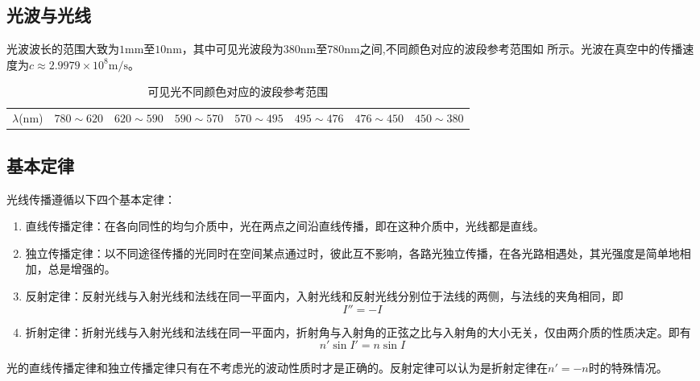 \documentclass[cn,10pt,chinesefont=founder,math=newtx,cite=super,twoside]{elegantbook}
\begin{document}
\subsection{光波与光线}
光波波长的范围大致为$1\mathrm{mm}$至$10\mathrm{nm}$，其中可见光波段为$380\mathrm{nm}$至$780\mathrm{nm}$之间,不同颜色对应的波段参考范围如 所示。光波在真空中的传播速度为$c\approx 2.9979\times 10^8\mathrm{m/s}$。

\begin{table}[htbp]
	\small
	\caption{可见光不同颜色对应的波段参考范围}
	\centering
	\begin{tabular}{cccccccc}
		\toprule
		&\color{red}{红色}&\color{orange}{橙色}&\color{yellow}{黄色}&\color{green}{绿色}&\color{cyan}{青色}&\color{blue}{蓝色}&\color{violet}{紫色}\\
		\midrule
		$\lambda$(nm)&$780\sim620$&$620\sim590$&$590\sim570$&$570\sim495$&$495\sim476$&$476\sim450$&$450\sim380$\\
		\bottomrule
	\end{tabular}
	\label{tab:visible-light}
\end{table}

\subsection{基本定律}
\label{subsect:basic-law}
光线传播遵循以下四个基本定律：
\begin{enumerate}
	\item 直线传播定律：在各向同性的均匀介质中，光在两点之间沿直线传播，即在这种介质中，光线都是直线。
	\item 独立传播定律：以不同途径传播的光同时在空间某点通过时，彼此互不影响，各路光独立传播，在各光路相遇处，其光强度是简单地相加，总是增强的。
	\item 反射定律：反射光线与入射光线和法线在同一平面内，入射光线和反射光线分别位于法线的两侧，与法线的夹角相同，即
	\begin{equation}
	I''=-I
	\end{equation}
	\item 折射定律：折射光线与入射光线和法线在同一平面内，折射角与入射角的正弦之比与入射角的大小无关，仅由两介质的性质决定。即有
	\begin{equation}
	n'\sin I'=n\sin I
	\end{equation}
\end{enumerate}

\begin{note}
	光的直线传播定律和独立传播定律只有在不考虑光的波动性质时才是正确的。反射定律可以认为是折射定律在$n'=-n$时的特殊情况。
\end{note}
\end{document}
